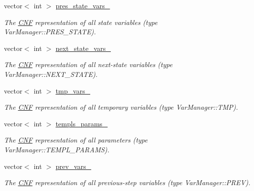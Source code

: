 \begin{DoxyCompactItemize}
vector$<$ int $>$ \hyperlink{classVarManager_a25edf00cec0e31f140aabdf3a245a54c}{pres\-\_\-state\-\_\-vars\-\_\-}
\begin{DoxyCompactList}\small\item\em The \hyperlink{classCNF}{C\-N\-F} representation of all state variables (type Var\-Manager\-::\-P\-R\-E\-S\-\_\-\-S\-T\-A\-T\-E). \end{DoxyCompactList}\item 
vector$<$ int $>$ \hyperlink{classVarManager_a2a697fcb384c73821d88104ac904f4e9}{next\-\_\-state\-\_\-vars\-\_\-}
\begin{DoxyCompactList}\small\item\em The \hyperlink{classCNF}{C\-N\-F} representation of all next-\/state variables (type Var\-Manager\-::\-N\-E\-X\-T\-\_\-\-S\-T\-A\-T\-E). \end{DoxyCompactList}\item 
vector$<$ int $>$ \hyperlink{classVarManager_aa22f9522aa27237a2dee30503c20e45f}{tmp\-\_\-vars\-\_\-}
\begin{DoxyCompactList}\small\item\em The \hyperlink{classCNF}{C\-N\-F} representation of all temporary variables (type Var\-Manager\-::\-T\-M\-P). \end{DoxyCompactList}\item 
vector$<$ int $>$ \hyperlink{classVarManager_aea1a2e16d5a0ff433d47a4f28cc2ae3b}{templs\-\_\-params\-\_\-}
\begin{DoxyCompactList}\small\item\em The \hyperlink{classCNF}{C\-N\-F} representation of all parameters (type Var\-Manager\-::\-T\-E\-M\-P\-L\-\_\-\-P\-A\-R\-A\-M\-S). \end{DoxyCompactList}\item 
vector$<$ int $>$ \hyperlink{classVarManager_add744e4a073f7fd7bc595b053ac94774}{prev\-\_\-vars\-\_\-}
\begin{DoxyCompactList}\small\item\em The \hyperlink{classCNF}{C\-N\-F} representation of all previous-\/step variables (type Var\-Manager\-::\-P\-R\-E\-V). \end{DoxyCompactList}\end{DoxyCompactItemize}
